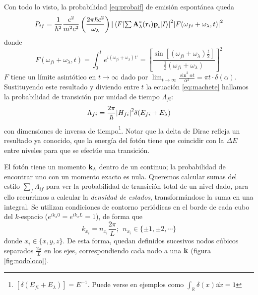 Con todo lo visto, la probabilidad \eqref{eq:probaif} de emisión
espontánea queda
\begin{equation}
  P_{if} = \frac{1}{\hbar^2} \frac{e^2}{m^2c^2} \left( \frac{2\pi
      \hbar c^2}{\omega_\lambda} \right) \abs{\mel{F}{\textstyle \sum \displaystyle
      \bm{\mathrm{A}}_\lambda^*(\bm{\mathrm{r}}_i)\bm{\mathrm{p}}_i}{I}}^2
  \abs{F(\omega_{fi}+\omega_\lambda,t)}^2
  \label{eq:machete}
\end{equation}
donde 
\begin{equation}
F(\omega_{fi}+\omega_\lambda,t) = \int_0^t
e^{i(\omega_{fi}+\omega_\lambda)t'} = \left[ \frac{\sin[(\omega_{fi}+\omega_\lambda)\frac{t}{2}]}{\frac{1}{2}(\omega_{fi}+\omega_\lambda)} \right]^2
\end{equation}
$F$ tiene un límite asintótico en $t\to\infty$ dado por
$\lim_{t\to\infty}\frac{\sin^2\alpha t}{\alpha^2}=\pi t \cdot
\delta(\alpha)$. Sustituyendo este resultado y diviendo entre $t$ la
ecuación \eqref{eq:machete} hallamos la probabilidad de transición por
unidad de tiempo $\Lambda_{fi}$:
\begin{equation}
  \Lambda_{fi} = \frac{2\pi}{\hbar} \abs{H_{fi}}^2 \delta(E_{fi}+E_\lambda)
\end{equation}
con dimensiones de inversa de
tiempo\footnote{$[\delta(E_{fi}+E_\lambda)]=E^{-1}$. Puede verse en
  ejemplos como $\int_{\mathbb{R}}\delta(x)\dd{x}=1$}. Notar que la
delta de Dirac refleja un resultado ya conocido, que la energía del
fotón tiene que coincidir con la $\Delta E$ entre niveles para que se
efectúe una transición.

El fotón tiene un momento $\bm{\mathrm{k}}_\lambda$ dentro de un continuo;
la probabilidad de encontrar uno con un momento exacto es nula.
Queremos calcular sumas del estilo $\sum_{f}\Lambda_{if}$ para ver la
probabilidad de transición total de un nivel dado, para ello
recurrimos a calcular la \emph{densidad de estados}, transformándose
la suma en una integral.
Se utilizan condiciones de contorno periódicas en
el borde de cada cubo del $k$-espacio ($e^{ik_x0}=e^{ik_xL}=1$), de forma que
\begin{equation}
  k_{x_i} = n_{x_i} \frac{2\pi}{L}; \ \ n_{x_i} \in \{\pm1,\pm2,\cdots\}
\end{equation}
donde $x_i \in \{x,y,z\}$. De esta forma, quedan definidos sucesivos
nodos cúbicos separados $\frac{2\pi}{L}$ en los ejes, correspondiendo
cada nodo a una $\bm{\mathrm{k}}$ (figura \ref{fig:nodoloco}).


